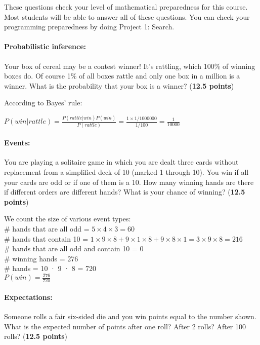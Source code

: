 \documentclass[12pt,twoside]{article}
\begin{document}


These questions check your level of mathematical preparedness for this course. Most students will be able to answer all of these questions. You can check your programming preparedness by doing Project 1: Search. 



\paragraph{Probabilistic inference:} Your box of cereal may be a contest winner! It’s rattling, which 100\% of winning boxes do. Of course 1\% of all boxes rattle and only one box in a million is a winner. What is the probability that your box is a winner? (\textbf{12.5 points})

{\color{red}
According to Bayes’ rule:

$P(win|rattle)=\frac{P(rattle|win)P(win)}{P(rattle)}=\frac{1\times1/1000000}{1/100}=\frac{1}{10000}$

}

\paragraph{Events:} You are playing a solitaire game in which you are dealt three cards without replacement from a simplified deck of 10 (marked 1 through 10). You win if all your cards are odd or if one of them is a 10. How many winning hands are there if different orders are different hands? What is your chance of winning? (\textbf{12.5 points})

{\color{red}
	We count the size of various event types:\\
	\# hands that are all odd = $5 \times 4 \times 3 = 60$\\
	\# hands that contain 10 = $1 \times 9 \times 8 + 9 \times 1 \times 8 + 9 \times 8 \times 1 = 3 \times 9 \times 8 = 216$\\
	\# hands that are all odd and contain 10 = 0\\
	\# winning hands = 276\\
	\# hands = 10 · 9 · 8 = 720\\
	$P(win)=\frac{276}{720}$

}

\paragraph{Expectations:} Someone rolls a fair six-sided die and you win points equal to the number shown. What is the expected number of points after one roll? After 2 rolls? After 100 rolls? (\textbf{12.5 points})
\end{document}

